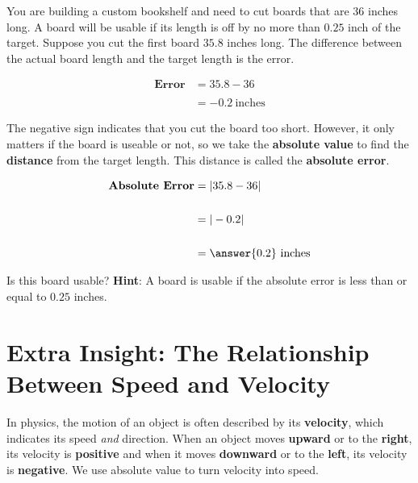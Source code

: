 \documentclass{ximera}[font=12pt]
\begin{document}
\begin{problem}
You are building a custom bookshelf and need to cut boards that are $36$ inches long.  A board will be usable if its 
length is off by no more than $0.25$ inch of the target.  Suppose you cut the first board $35.8$ inches long.  The 
difference between the actual board length and the target length is the error.

\begin{align*}
  \textbf{Error} &= 35.8 - 36 \\
        &  \\
        &= -0.2 \  \textrm{inches}
\end{align*}

The negative sign indicates that you cut the board too short.  However, it only matters if the board is useable or not, so we 
take the \textbf{absolute value} to find the \textbf{distance} from the target length.  This distance is called the \textbf{absolute error}.


\begin{align*}
\textbf{Absolute Error} &= |35.8 - 36| \\
    &  \\
    &= |-0.2| \\
    &  \\
    &=  \answer{0.2} \ \textrm{inches}
\end{align*}

Is this board usable? \textbf{Hint}: A board is usable if the absolute error is less than or equal to $0.25$ inches.

\begin{multipleChoice}
\end{multipleChoice}

\end{problem}

\section*{Extra Insight:  The Relationship Between Speed and Velocity}

In physics, the motion of an object is often described by its \textbf{velocity}, which indicates its speed \emph{and} direction.  
When an object moves \textbf{upward} or to the \textbf{right}, its velocity is \textbf{positive} and when it moves 
\textbf{downward} or to the \textbf{left}, its velocity is \textbf{negative}.  We use
absolute value to turn velocity into speed.
\end{document}
